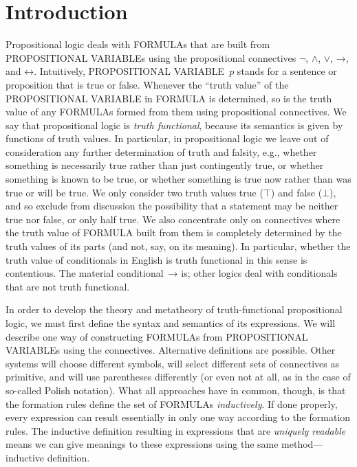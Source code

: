 \documentclass[10pt,a4paper]{article}
\newcommand*{\olup}[1]{\MakeUppercase{#1}}
\theoremstyle{plain}
\theoremstyle{definition}
\theoremstyle{remark}
\newcommand*{\olfileid}[3]{}
\newcommand*{\olsection}[1]{\section*{#1}}
\providecommand{\lif}{\mathbin{\rightarrow}}
\providecommand{\True}{\top}
\providecommand{\False}{\bot}
\providecommand{\liff}{\mathbin{\leftrightarrow}}
\begin{document}
\olfileid{pl}{syn}{int}

\olsection{Introduction}

Propositional logic deals with \olup{formula}s that are built from
\olup{propositional variable}s using the propositional connectives
$\lnot$, $\land$, $\lor$, $\lif$, and $\liff$.  Intuitively,
\olup{propositional variable}~$p$ stands for a sentence or proposition
that is true or false. Whenever the ``truth value'' of the
\olup{propositional variable} in \olup{formula} is determined, so is the
truth value of any \olup{formula}s formed from them using propositional
connectives.  We say that propositional logic is \emph{truth
  functional}, because its semantics is given by functions of truth
values. In particular, in propositional logic we leave out of
consideration any further determination of truth and falsity, e.g.,
whether something is necessarily true rather than just contingently
true, or whether something is known to be true, or whether something
is true now rather than was true or will be true.  We only consider
two truth values true ($\True$) and false ($\False$), and so exclude
from discussion the possibility that a statement may be neither true
nor false, or only half true. We also concentrate only on connectives where
the truth value of \olup{formula} built from them is completely
determined by the truth values of its parts (and not, say, on its
meaning). In particular, whether the truth value of conditionals in
English is truth functional in this sense is contentious. The material
conditional~$\lif$ is; other logics deal with conditionals that are
not truth functional.

In order to develop the theory and metatheory of truth-functional
propositional logic, we must first define the syntax and semantics of
its expressions.  We will describe one way of constructing
\olup{formula}s from \olup{propositional variable}s using the connectives.
Alternative definitions are possible. Other systems will choose
different symbols, will select different sets of connectives as
primitive, and will use parentheses differently (or even not at all,
as in the case of so-called Polish notation).  What all approaches
have in common, though, is that the formation rules define the set of
\olup{formula}s \emph{inductively}. If done properly, every expression
can result essentially in only one way according to the formation
rules.  The inductive definition resulting in expressions that are
\emph{uniquely readable} means we can give meanings to these
expressions using the same method---inductive definition.
\end{document}
